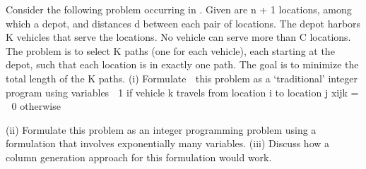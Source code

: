 \begin{exercise}
Consider the following problem occurring in . Given are n + 1 locations, among which a depot, and distances d between each pair of locations. The depot harbors K vehicles that serve
the locations. No vehicle can serve more than C locations. The problem is to select K paths (one for
each vehicle), each starting at the depot, such that each location is in exactly one path. The goal is to
minimize the total length of the K paths.
(i) Formulate
 this problem as a ‘traditional' integer program using variables
 1 if vehicle k travels from location i to location j
xijk =
 0 otherwise

(ii) Formulate this problem as an integer programming problem using a formulation that involves
exponentially many variables.
(iii) Discuss how a column generation approach for this formulation would work.
\end{exercise}
